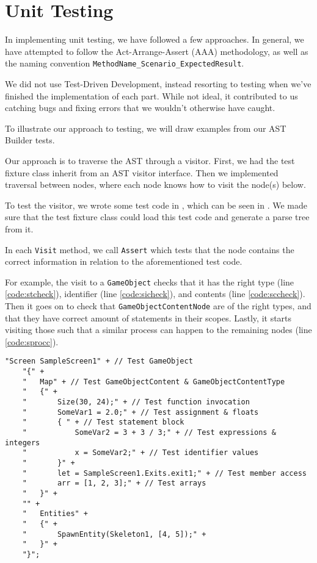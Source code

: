 \section{Unit Testing}
In implementing unit testing, we have followed a few approaches.
In general, we have attempted to follow the Act-Arrange-Assert (AAA)
methodology, as well as the naming convention 
\texttt{MethodName\_Scenario\_ExpectedResult}.

We did not use Test-Driven Development, instead resorting to testing
when we've finished the implementation of each part. While not ideal, it
contributed to us catching bugs and fixing errors that we wouldn't
otherwise have caught.

To illustrate our approach to testing, we will draw examples from our
AST Builder tests.

Our approach is to traverse the AST through a visitor. First,
we had the test fixture class inherit from an AST visitor interface.
Then we implemented traversal between nodes, where each node knows how
to visit the node(s) below.

To test the visitor, we wrote some test code in \dazel{}, which can be seen in . We made sure that
the test fixture class could load this test code and generate a parse
tree from it.

In each \texttt{Visit} method, we call \texttt{Assert} which tests
that the node contains the correct information in relation to the
aforementioned \dazel{} test code.

For example, the visit to a \texttt{GameObject} checks that it has the
right type (line \ref{code:stcheck}), identifier (line \ref{code:sicheck}), and contents (line \ref{code:sccheck}). Then it goes on to check that
\texttt{GameObjectContentNode} are of the right types, and that they have
correct amount of statements in their scopes. Lastly, it starts visiting
those such that a similar process can happen to the remaining nodes (line \ref{code:sprocc}).

\begin{lstlisting}[caption={AST Builder \dazel{} test code}, label={lst:asttestcode}]
    "Screen SampleScreen1" + // Test GameObject
    "{" +
    "   Map" + // Test GameObjectContent & GameObjectContentType
    "   {" +
    "       Size(30, 24);" + // Test function invocation
    "       SomeVar1 = 2.0;" + // Test assignment & floats
    "       { " + // Test statement block
    "           SomeVar2 = 3 + 3 / 3;" + // Test expressions & integers
    "           x = SomeVar2;" + // Test identifier values
    "       }" +
    "       let = SampleScreen1.Exits.exit1;" + // Test member access 
    "       arr = [1, 2, 3];" + // Test arrays
    "   }" +
    "" +
    "   Entities" +
    "   {" +
    "       SpawnEntity(Skeleton1, [4, 5]);" +
    "   }" +
    "}";
    \end{lstlisting}


